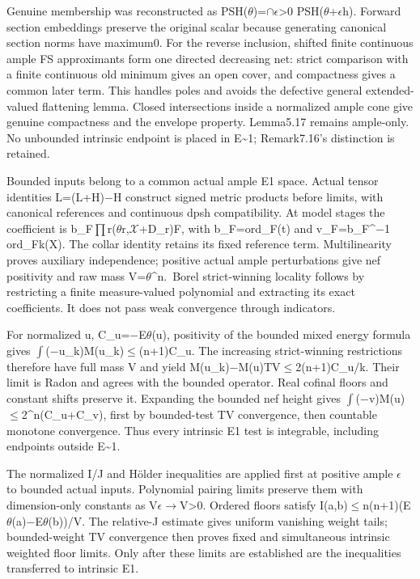 \documentclass[
]{article}
\begin{document}
Genuine membership was reconstructed as PSH(\ensuremath{\theta})=\ensuremath{\cap}\ensuremath{\epsilon}\textgreater0
PSH(\ensuremath{\theta}+\ensuremath{\epsilon}h). Forward section embeddings preserve the original scalar
because generating canonical section norms have maximum0. For the
reverse inclusion, shifted finite continuous ample FS approximants form
one directed decreasing net: strict comparison with a finite continuous
old minimum gives an open cover, and compactness gives a common later
term. This handles poles and avoids the defective general
extended-valued flattening lemma. Closed intersections inside a
normalized ample cone give genuine compactness and the envelope
property. Lemma5.17 remains ample-only. No unbounded intrinsic endpoint
is placed in E\textasciitilde1; Remark7.16's distinction is retained.

Bounded inputs belong to a common actual ample E1 space. Actual tensor
identities L=(L+H)\ensuremath{-}H construct signed metric products before limits,
with canonical references and continuous dpsh compatibility. At model
stages the coefficient is b\_F\ensuremath{\prod}r(\ensuremath{\theta}r,\ensuremath{\mathcal{X}}+D\_r)\textbar F, with
b\_F=ord\_F(t) and v\_F=b\_F\^{}\ensuremath{-}1 ord\_F\textbar k(X). The collar
identity retains its fixed reference term. Multilinearity proves
auxiliary independence; positive actual ample perturbations give nef
positivity and raw mass V=\ensuremath{\theta}\^{}n.~Borel strict-winning locality follows
by restricting a finite measure-valued polynomial and extracting its
exact coefficients. It does not pass weak convergence through
indicators.

For normalized u, C\_u=\ensuremath{-}E\ensuremath{\theta}(u), positivity of the bounded mixed energy
formula gives \ensuremath{\int}(\ensuremath{-}u\_k)M(u\_k)\ensuremath{\leq}(n+1)C\_u. The increasing strict-winning
restrictions therefore have full mass V and yield
\textbar\textbar M(u\_k)\ensuremath{-}M(u)\textbar\textbar TV\ensuremath{\leq}2(n+1)C\_u/k. Their
limit is Radon and agrees with the bounded operator. Real cofinal floors
and constant shifts preserve it. Expanding the bounded nef height gives
\ensuremath{\int}(\ensuremath{-}v)M(u)\ensuremath{\leq}2\^{}n(C\_u+C\_v), first by bounded-test TV convergence, then
countable monotone convergence. Thus every intrinsic E1 test is
integrable, including endpoints outside E\textasciitilde1.

The normalized I/J and Hölder inequalities are applied first at positive
ample \ensuremath{\epsilon} to bounded actual inputs. Polynomial pairing limits preserve
them with dimension-only constants as V\ensuremath{\epsilon}\ensuremath{\to}V\textgreater0. Ordered floors
satisfy I(a,b)\ensuremath{\leq}n(n+1)(E\ensuremath{\theta}(a)\ensuremath{-}E\ensuremath{\theta}(b))/V. The relative-J estimate gives
uniform vanishing weight tails; bounded-weight TV convergence then
proves fixed and simultaneous intrinsic weighted floor limits. Only
after these limits are established are the inequalities transferred to
intrinsic E1.
\end{document}
